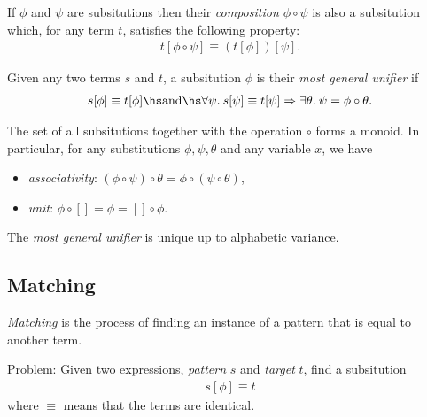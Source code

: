 \documentclass{article}
\begin{document}
\begin{definition}
	If $\phi$ and $\psi$ are subsitutions then their \emph{composition $\phi\circ\psi$}
	is also a subsitution which, for any term $t$, satisfies the following property:
	\begin{align*}
		t[\phi\circ\psi] \equiv (t[\phi])[\psi].
	\end{align*}
\end{definition}

\begin{definition}
	Given any two terms $s$ and $t$, a subsitution $\phi$ is their \emph{most general unifier}
	if
	\begin{align*}
		s[\phi]\equiv t[\phi] \hs\text{and}\hs
		\forall \psi.\: s[\psi] \equiv t[\psi]  \Rightarrow \exists \theta.\: \psi = \phi \circ \theta.
	\end{align*}
\end{definition}

\begin{theorem}
	The set of all subsitutions together with the operation $\circ$ forms a monoid. In particular,
	for any substitutions $\phi,\psi,\theta$ and any variable $x$, we have
	\begin{itemize}
		\item \emph{associativity}: $(\phi \circ \psi) \circ \theta = \phi \circ (\psi \circ \theta)$,
		\item \emph{unit}: $\phi\circ[] = \phi = []\circ\phi$.
	\end{itemize}
\end{theorem}

\begin{theorem}
	The \emph{most general unifier} is unique up to alphabetic variance.
\end{theorem}

\subsection{Matching}

\begin{definition}
	\emph{Matching} is the process of finding an instance of a pattern that is equal to another term.

	Problem: Given two expressions, \emph{pattern} $s$ and \emph{target} $t$, find a subsitution
	\begin{align*}
		s[\phi] \equiv t
	\end{align*}
	where $\equiv$ means that the terms are identical.
\end{definition}
\end{document}
